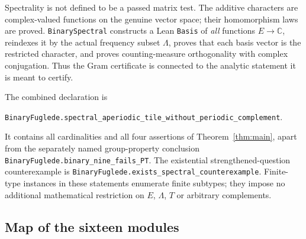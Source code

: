 \documentclass[11pt]{article}
\theoremstyle{definition}\newtheorem{definition}[theorem]{Definition}
\theoremstyle{remark}\newtheorem{remark}[theorem]{Remark}
\newcommand{\C}{\mathbb C}
\newcommand{\code}[1]{\texttt{\small #1}}
\begin{document}
Spectrality is not defined to be a passed matrix test. The additive characters are complex-valued functions on the genuine vector space; their homomorphism laws are proved. \code{BinarySpectral} constructs a Lean \code{Basis} of \emph{all} functions $E\to\C$, reindexes it by the actual frequency subset $\Lambda$, proves that each basis vector is the restricted character, and proves counting-measure orthogonality with complex conjugation. Thus the Gram certificate is connected to the analytic statement it is meant to certify.

The combined declaration is
\begin{center}
\small\nolinkurl{BinaryFuglede.spectral_aperiodic_tile_without_periodic_complement}.
\end{center}
It contains all cardinalities and all four assertions of Theorem~\ref{thm:main}, apart from the separately named group-property conclusion
\code{BinaryFuglede.binary\_nine\_fails\_PT}.
The existential strengthened-question counterexample is
\code{BinaryFuglede.exists\_spectral\_counterexample}.
Finite-type instances in these statements enumerate finite subtypes; they impose no additional mathematical restriction on $E$, $\Lambda$, $T$ or arbitrary complements.

\subsection{Map of the sixteen modules}
\end{document}
